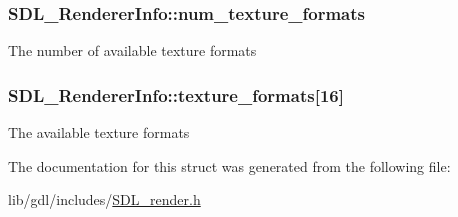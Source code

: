 \subsubsection[{num\+\_\+texture\+\_\+formats}]{ S\+D\+L\+\_\+\+Renderer\+Info\+::num\+\_\+texture\+\_\+formats}\label{struct_s_d_l___renderer_info_acdec165b2053b914313f5996983ec6b8}
The number of available texture formats \hypertarget{struct_s_d_l___renderer_info_a88450f9d48e593ec4571e3ba7cc3427d}{}
\subsubsection[{texture\+\_\+formats}]{ S\+D\+L\+\_\+\+Renderer\+Info\+::texture\+\_\+formats\mbox{[}16\mbox{]}}\label{struct_s_d_l___renderer_info_a88450f9d48e593ec4571e3ba7cc3427d}
The available texture formats 

The documentation for this struct was generated from the following file\+:\begin{DoxyCompactItemize}
\item 
lib/gdl/includes/\hyperlink{_s_d_l__render_8h}{S\+D\+L\+\_\+render.\+h}\end{DoxyCompactItemize}
